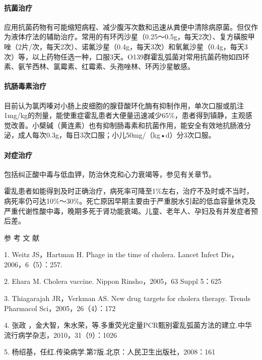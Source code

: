 \paragraph{抗菌治疗}

应用抗菌药物有可能缩短病程、减少腹泻次数和迅速从粪便中清除病原菌。但仅作为液体疗法的辅助治疗。常用的有环丙沙星（0.25～0.5g，每天2次）、复方磺胺甲{}
唑（2片/次，每天2次）、诺氟沙星（0.4g，每天3次）和氧氟沙星（0.4g，每天3次）等，以上药物任选一种，口服3天。O139群霍乱弧菌对常用抗菌药物如四环素、氨苄西林、氯霉素、红霉素、头孢唑林、环丙沙星敏感。

\paragraph{抗肠毒素治疗}

目前认为氯丙嗪对小肠上皮细胞的腺苷酸环化酶有抑制作用，单次口服或肌注1mg/kg的剂量，能使重症霍乱患者大便量迅速减少65\%，患者得到镇静，主观感觉改善。小檗碱（黄连素）也有抑制肠毒素和抗菌作用，能安全有效地抗肠液分泌，成人每次0.3g，每日3次口服；小儿50mg/（kg•d）分3次口服。

\paragraph{对症治疗}

包括纠正酸中毒与低血钾，防治休克和心力衰竭等，参见有关章节。

霍乱患者如能得到及时正确治疗，病死率可降至1\%左右，治疗不及时或不当时，病死率仍可达10\%～30\%。死亡原因早期主要由于严重脱水引起的低血容量休克及严重代谢性酸中毒，晚期多死于肾功能衰竭。儿童、老年人、孕妇及有并发症者预后差。

\protect\hypertarget{text00230.html}{}{}

\hypertarget{text00230.htmlux5cux23CHP7-10-4}{}
参 考 文 献

1. Weitz JS，Hartman H. Phage in the time of cholera. Lancet Infect
Dis，2006，6（5）：257.

2. Ehara M. Cholera vaccine. Nippon Rinsho，2005，63 Suppl 5：625

3. Thiagarajah JR，Verkman AS. New drug targets for cholera therapy.
Trends Pharmacol Sci，2005，26（4）：172

4. 张政
，金大智，朱水荣，等.多重荧光定量PCR甄别霍乱弧菌方法的建立.中华流行病学杂志，2010，31（9）：1026

5. 杨绍基，任红.传染病学.第7版.北京：人民卫生出版社，2008：161

\protect\hypertarget{text00231.html}{}{}

